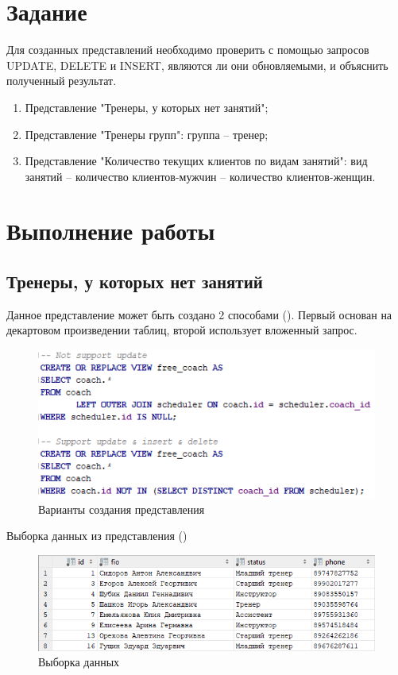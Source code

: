 \documentclass[a4paper,14pt]{article}
\begin{document}

\tableofcontents
\pagebreak

\section{Задание}

Для созданных представлений необходимо проверить с помощью запросов UPDATE, DELETE и INSERT, являются ли они обновляемыми, и объяснить полученный результат.

\begin{enumerate}
	\item Представление "Тренеры, у которых нет занятий";
	\item Представление "Тренеры групп": группа – тренер;
	\item Представление "Количество текущих клиентов по видам занятий": вид занятий – количество клиентов-мужчин – количество клиентов-женщин.
\end{enumerate}

\section{Выполнение работы}

\subsection{Тренеры, у которых нет занятий}

	Данное представление может быть создано 2 способами ().
	Первый основан на декартовом произведении таблиц, второй использует вложенный запрос.
	
	\begin{figure}[H]
		\centering		
		\includegraphics[width=0.7\linewidth]{image/viewCreate_01}
		\caption{Варианты создания представления}\label{img:viewCreate_01}
	\end{figure}

	Выборка данных из представления ()

	\begin{figure}[H]
		\centering		
		\includegraphics[width=0.7\linewidth]{image/viewSelect_01}
		\caption{Выборка данных}\label{img:viewSelect_01}
	\end{figure}
 
\end{document}

